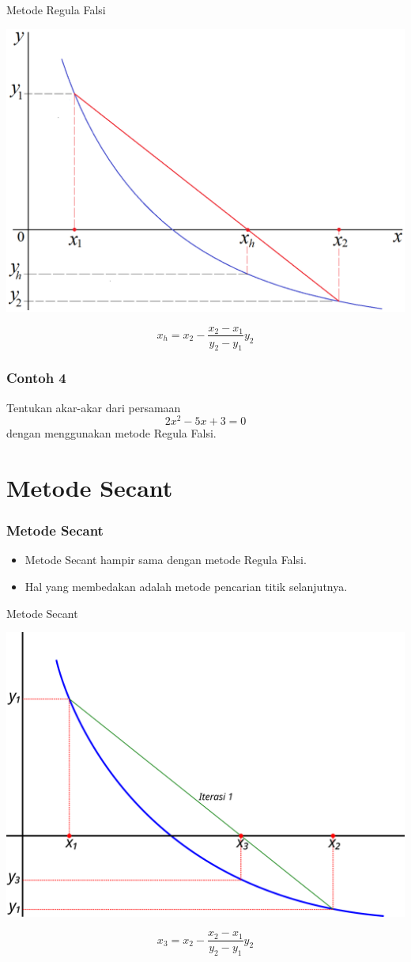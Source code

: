 \documentclass[pdflatex,compress]{beamer}
\begin{document}
\begin{frame}{Metode Regula Falsi}
	\begin{center}
		\includegraphics[width=0.7\linewidth]{img/03}
	\end{center}
	$$ x_h = x_2 - \frac{x_2 - x_1}{y_2 - y_1}y_2 $$
\end{frame}

\begin{frame}
	\frametitle{Contoh 4}
	Tentukan akar-akar dari persamaan $$ 2x^2 - 5x + 3 = 0 $$ dengan menggunakan metode Regula Falsi.
\end{frame}

\section{Metode Secant}

\begin{frame}
	\frametitle{Metode Secant}
	\begin{itemize}
		\item Metode Secant hampir sama dengan metode Regula Falsi.
		\item Hal yang membedakan adalah metode pencarian titik selanjutnya.
	\end{itemize}
\end{frame}

\begin{frame}{Metode Secant}
	\begin{center}
		\includegraphics[width=0.7\linewidth]{img/04}
	\end{center}
	$$ x_3 = x_{2} - \frac{x_{2}-x_{1}}{y_{2}-y_{1}}y_{2} $$
\end{frame}
\end{document}
